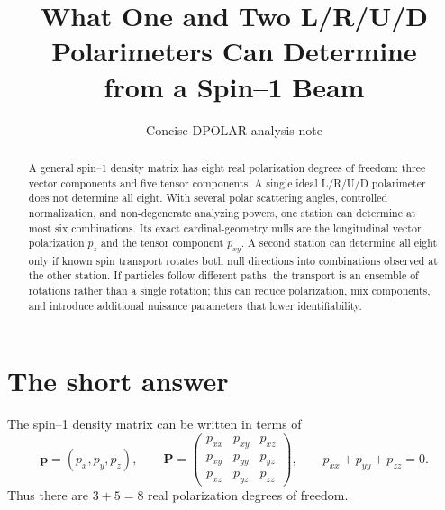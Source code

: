 \documentclass[11pt,a4paper]{article}
\title{What One and Two L/R/U/D Polarimeters Can Determine\\
from a Spin--1 Beam}
\author{Concise DPOLAR analysis note}
\date{}
\newcommand{\vect}[1]{\bm{#1}}
\newcommand{\Tens}{\bm P}
\begin{document}
\maketitle

\begin{abstract}
A general spin--1 density matrix has eight real polarization degrees of freedom:
three vector components and five tensor components.  A single ideal L/R/U/D
polarimeter does not determine all eight.  With several polar scattering angles,
controlled normalization, and non-degenerate analyzing powers, one station can
determine at most six combinations.  Its exact cardinal-geometry nulls are the
longitudinal vector polarization $p_z$ and the tensor component $p_{xy}$.  A
second station can determine all eight only if known spin transport rotates both
null directions into combinations observed at the other station.  If particles
follow different paths, the transport is an ensemble of rotations rather than a
single rotation; this can reduce polarization, mix components, and introduce
additional nuisance parameters that lower identifiability.
\end{abstract}

\section{The short answer}

The spin--1 density matrix can be written in terms of
\begin{equation}
 \vect p=(p_x,p_y,p_z),\qquad
 \Tens=
 \begin{pmatrix}
 p_{xx}&p_{xy}&p_{xz}\\
 p_{xy}&p_{yy}&p_{yz}\\
 p_{xz}&p_{yz}&p_{zz}
 \end{pmatrix},\qquad
 p_{xx}+p_{yy}+p_{zz}=0.
\end{equation}
Thus there are $3+5=8$ real polarization degrees of freedom.
\end{document}
